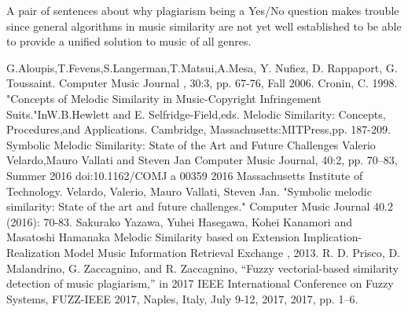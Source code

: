 \documentclass{article}
\begin{document}
		A pair of sentences about why plagiarism being a Yes/No question makes trouble since general algorithms in music similarity are not yet well established to be able to provide a unified solution to music of all genres.


	\begin{thebibliography}{9}
		G.Aloupis,T.Fevens,S.Langerman,T.Matsui,A.Mesa, Y. Nufiez, D. Rappaport, G. Toussaint. Computer Music Journal , 30:3, pp. 67-76, Fall 2006.
		Cronin, C. 1998. "Concepts of Melodic Similarity in
		Music-Copyright Infringement Suits."InW.B.Hewlett and E. Selfridge-Field,eds. Melodic Similarity: Concepts, Procedures,and Applications. Cambridge, Massachusetts:MITPress,pp. 187-209.
		Symbolic Melodic Similarity: State of the Art and Future Challenges
		Valerio Velardo,Mauro Vallati and Steven Jan
		Computer Music Journal, 40:2, pp. 70–83, Summer 2016 doi:10.1162/COMJ a 00359
		2016 Massachusetts Institute of Technology.
		Velardo, Valerio, Mauro Vallati, Steven Jan.
		"Symbolic melodic similarity: State of the art and future challenges." Computer Music Journal 40.2 (2016): 70-83.
		Sakurako Yazawa, Yuhei Hasegawa, Kohei Kanamori and Masatoshi Hamanaka
		Melodic Similarity based on Extension Implication-Realization Model
		Music Information Retrieval Exchange , 2013.
		R. D. Prisco, D. Malandrino, G. Zaccagnino, and R. Zaccagnino, “Fuzzy
        vectorial-based similarity detection of music plagiarism,” in 2017 IEEE
        International Conference on Fuzzy Systems, FUZZ-IEEE 2017, Naples,
        Italy, July 9-12, 2017, 2017, pp. 1–6.


	\end{thebibliography}
\end{document}
